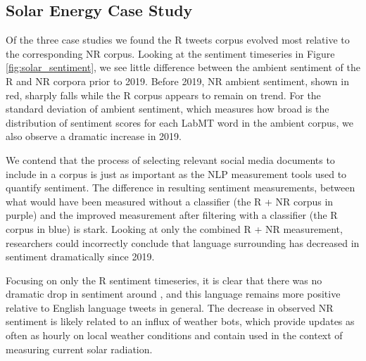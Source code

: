 \subsection{Solar Energy Case Study}
\label{sec:corpusCreation.results.solar}

Of the three case studies 
we found the R  tweets corpus evolved
most relative to the corresponding NR corpus.
Looking at the sentiment timeseries in Figure \ref{fig:solar_sentiment}, 
we see little difference between the ambient sentiment of the R and NR corpora prior to 2019.
Before 2019, NR ambient sentiment, shown in red, sharply falls while the R corpus appears to remain on trend.
For the standard deviation of ambient sentiment, 
which measures how broad is the distribution of sentiment scores for each LabMT word in the ambient corpus,
we also observe a dramatic increase in 2019.

We contend that the process of selecting relevant social media documents to include in a corpus
is just as important as the NLP measurement tools
used to quantify sentiment.
The difference in resulting sentiment measurements,
between what would have been measured without a classifier
(the R + NR corpus in purple) 
and the improved measurement after filtering with a classifier 
(the R corpus in blue) 
is stark. 
Looking at only the combined R + NR measurement,
researchers could incorrectly conclude that language surrounding 
has decreased in sentiment dramatically since 2019. 

Focusing on only the R  sentiment timeseries,
it is clear that there was no dramatic drop in sentiment around , 
and this language remains more positive relative to English language tweets in general. 
The decrease in observed NR sentiment is likely related to an influx of weather bots,  
which provide updates as often as hourly on local weather conditions
and contain  used in the context of measuring current solar radiation.



